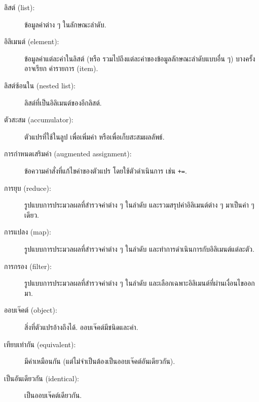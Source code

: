\begin{description}

\item[ลิสต์ (list):] ข้อมูลค่าต่าง ๆ ในลักษณะลำดับ.

\item[อิลิเมนต์ (element):] ข้อมูลค่าแต่ละค่าในลิสต์ (หรือ รวมไปถึงแต่ละค่าของข้อมูลลักษณะลำดับแบบอื่น ๆ) บางครั้งอาจเรียก ค่ารายการ (item).

\item[ลิสต์ซ้อนใน (nested list):] ลิสต์ที่เป็นอิลิเมนต์ของอีกลิสต์.

\item[ตัวสะสม (accumulator):] ตัวแปรที่ใช้ในลูป เพื่อเพิ่มค่า หรือเพื่อเก็บสะสมผลลัพธ์.

\item[การกำหนดเสริมค่า (augmented assignment):] ข้อความคำสั่งที่แก้ไขค่าของตัวแปร โดยใช้ตัวดำเนินการ เช่น \verb|+=|.


\item[การยุบ (reduce):] รูปแบบการประมวลผลที่สำรวจค่าต่าง ๆ ในลำดับ และรวมสรุปค่าอิลิเมนต์ต่าง ๆ มาเป็นค่า ๆ เดียว.


\item[การแปลง (map):] รูปแบบการประมวลผลที่สำรวจค่าต่าง ๆ ในลำดับ และทำการดำเนินการกับอิลิเมนต์แต่ละตัว.

\item[การกรอง (filter):] รูปแบบการประมวลผลที่สำรวจค่าต่าง ๆ ในลำดับ และเลือกเฉพาะอิลิเมนต์ที่ผ่านเงื่อนไขออกมา.


\item[ออบเจ๊คต์ (object):] สิ่งที่ตัวแปรอ้างถึงได้.  
ออบเจ๊คต์มีชนิดและค่า.


\item[เทียบเท่ากัน (equivalent):] มีค่าเหมือนกัน (แต่ไม่จำเป็นต้องเป็นออบเจ๊คต์อันเดียวกัน).

\item[เป็นอันเดียวกัน (identical):] เป็นออบเจ๊คต์เดียวกัน.


\end{description}
